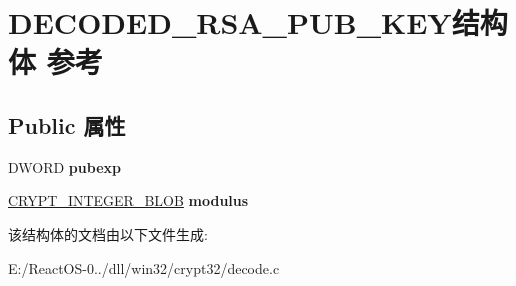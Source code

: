 \hypertarget{struct_d_e_c_o_d_e_d___r_s_a___p_u_b___k_e_y}{}\section{D\+E\+C\+O\+D\+E\+D\+\_\+\+R\+S\+A\+\_\+\+P\+U\+B\+\_\+\+K\+E\+Y结构体 参考}
\label{struct_d_e_c_o_d_e_d___r_s_a___p_u_b___k_e_y}
\subsection*{Public 属性}
\begin{DoxyCompactItemize}
\item 
\mbox{\label{struct_d_e_c_o_d_e_d___r_s_a___p_u_b___k_e_y_abe1967da267adb0e6ae73af825f9837e}} 
D\+W\+O\+RD {\bfseries pubexp}
\item 
\mbox{\label{struct_d_e_c_o_d_e_d___r_s_a___p_u_b___k_e_y_a8b46c6b9181dd911bdf0f9c3297c56f0}} 
\hyperlink{struct___c_r_y_p_t_o_a_p_i___b_l_o_b}{C\+R\+Y\+P\+T\+\_\+\+I\+N\+T\+E\+G\+E\+R\+\_\+\+B\+L\+OB} {\bfseries modulus}
\end{DoxyCompactItemize}


该结构体的文档由以下文件生成\+:\begin{DoxyCompactItemize}
\item 
E\+:/\+React\+O\+S-\/0../dll/win32/crypt32/decode.\+c\end{DoxyCompactItemize}
